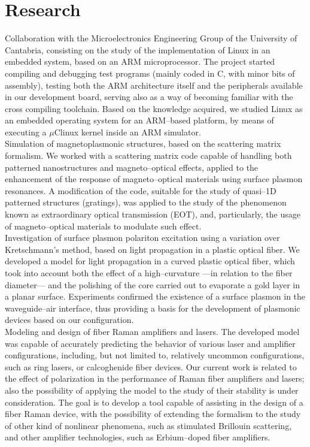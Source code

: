 \documentclass[11pt, a4paper]{article}
\newcommand{\years}[1]{\marginnote{\scriptsize #1}}
\begin{document}
\section*{Research} %
\noindent
\years{2005--2008}Collaboration with the Microelectronics Engineering Group of the University of Cantabria, consisting on the study of the implementation of Linux in an embedded system, based on an ARM microprocessor. The project started compiling and debugging test programs (mainly coded in C, with minor bits of assembly), testing both the ARM architecture itself and the peripherals available in our development board, serving also as a way of becoming familiar with the cross compiling toolchain. Based on the knowledge acquired, we studied Linux as an embedded operating system for an ARM--based platform, by means of executing a $\mu$Clinux kernel inside an ARM simulator.\\
\years{2008--2009}Simulation of magnetoplasmonic structures, based on the scattering matrix formalism. We worked with a scattering matrix code capable of handling both patterned nanostructures and magneto--optical effects, applied to the enhancement of the response of magneto--optical materials using surface plasmon resonances. A modification of the code, suitable for the study of quasi--1D patterned structures (gratings), was applied to the study of the phenomenon known as extraordinary optical transmission (EOT), and, particularly, the usage of magneto--optical materials to modulate such effect.\\
\years{2009--present}Investigation of surface plasmon polariton excitation using a variation over Kretschmann's method, based on light propagation in a plastic optical fiber. We developed a model for light propagation in a curved plastic optical fiber, which took into account both the effect of a high--curvature ---in relation to the fiber diameter--- and the polishing of the core carried out to evaporate a gold layer in a planar surface. Experiments confirmed the existence of a surface plasmon in the waveguide--air interface, thus providing a basis for the development of plasmonic devices based on our configuration.\\
\years{2010--present}Modeling and design of fiber Raman amplifiers and lasers. The developed model was capable of accurately predicting the behavior of various laser and amplifier configurations, including, but not limited to, relatively uncommon configurations, such as ring lasers, or calcoghenide fiber devices. Our current work is related to the effect of polarization in the performance of Raman fiber amplifiers and lasers; also the possibility of applying the model to the study of their stability is under consideration. The goal is to develop a tool capable of assisting in the design of a fiber Raman device, with the possibility of extending the formalism to the study of other kind of nonlinear phenomena, such as stimulated Brillouin scattering, and other amplifier technologies, such as Erbium--doped fiber amplifiers.\\
\end{document}
